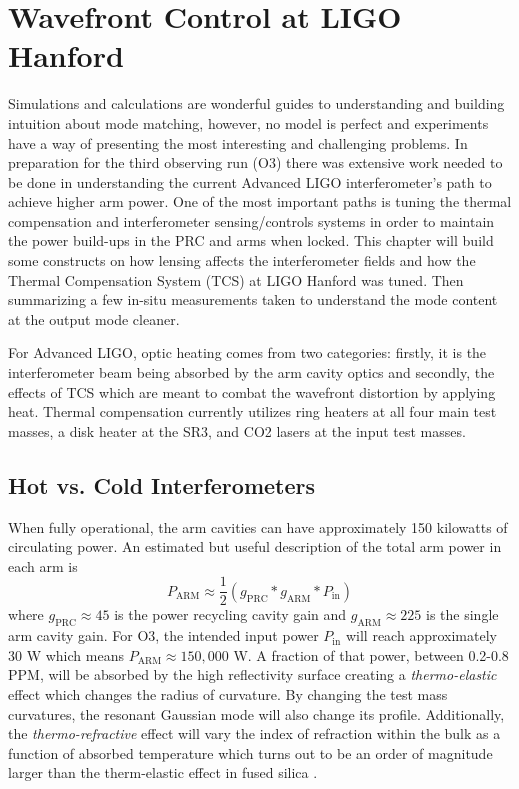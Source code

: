 \chapter{Wavefront Control at LIGO Hanford}\label{chapter:MM_LHO}
	Simulations and calculations are wonderful guides to understanding and building intuition about mode matching, however, no model is perfect and experiments have a way of presenting the most interesting and challenging problems.  In preparation for the third observing run (O3) there was extensive work needed to be done in understanding the current Advanced LIGO interferometer's path to achieve higher arm power.  One of the most important paths is tuning the thermal compensation and interferometer sensing/controls systems in order to maintain the power build-ups in the PRC and arms when locked.  This chapter will build some constructs on how lensing affects the interferometer fields and how the Thermal Compensation System (TCS) at LIGO Hanford was tuned. Then summarizing a few in-situ measurements taken to understand the mode content at the output mode cleaner.
	
	For Advanced LIGO, optic heating comes from two categories: firstly, it is the interferometer beam being absorbed by the arm cavity optics and secondly, the effects of TCS which are meant to combat the wavefront distortion by applying heat.  Thermal compensation currently utilizes ring heaters at all four main test masses, a disk heater at the SR3, and CO2 lasers at the input test masses.
	
	\section{Hot vs. Cold Interferometers}\label{sec:hotcoldifo}
	When fully operational, the arm cavities can have approximately 150 kilowatts of circulating power. An estimated but useful description of the total arm power in each arm is
	\begin{equation}
		P_{\text{ARM}} \approx \frac{1}{2} (g_{\text{PRC}} * g_{\text{ARM}} * P_{\text{in}})
	\end{equation}
	where $g_{\text{PRC}} \approx 45$ is the power recycling cavity gain and $g_{\text{ARM}} \approx 225$ is the single arm cavity gain. For O3, the intended input power $P_{\text{in}}$ will reach approximately 30 W which means $P_{\text{ARM}} \approx 150,000$ W. A fraction of that power, between 0.2-0.8 PPM, will be absorbed by the high reflectivity surface creating a \textit{thermo-elastic} effect which changes the radius of curvature. By changing the test mass curvatures, the resonant Gaussian mode will also change its profile. Additionally, the \textit{thermo-refractive} effect will vary the index of refraction within the bulk as a function of absorbed temperature which turns out to be an order of magnitude larger than the therm-elastic effect in fused silica \cite{winkler_thermaldist}.
	
